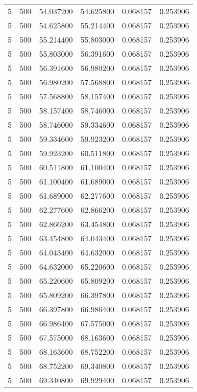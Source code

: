 \begin{longtable}{rrrrrr}
5 & 500 & 54.037200 & 54.625800 & 0.068157 & 0.253906 \\
5 & 500 & 54.625800 & 55.214400 & 0.068157 & 0.253906 \\
5 & 500 & 55.214400 & 55.803000 & 0.068157 & 0.253906 \\
5 & 500 & 55.803000 & 56.391600 & 0.068157 & 0.253906 \\
5 & 500 & 56.391600 & 56.980200 & 0.068157 & 0.253906 \\
5 & 500 & 56.980200 & 57.568800 & 0.068157 & 0.253906 \\
5 & 500 & 57.568800 & 58.157400 & 0.068157 & 0.253906 \\
5 & 500 & 58.157400 & 58.746000 & 0.068157 & 0.253906 \\
5 & 500 & 58.746000 & 59.334600 & 0.068157 & 0.253906 \\
5 & 500 & 59.334600 & 59.923200 & 0.068157 & 0.253906 \\
5 & 500 & 59.923200 & 60.511800 & 0.068157 & 0.253906 \\
5 & 500 & 60.511800 & 61.100400 & 0.068157 & 0.253906 \\
5 & 500 & 61.100400 & 61.689000 & 0.068157 & 0.253906 \\
5 & 500 & 61.689000 & 62.277600 & 0.068157 & 0.253906 \\
5 & 500 & 62.277600 & 62.866200 & 0.068157 & 0.253906 \\
5 & 500 & 62.866200 & 63.454800 & 0.068157 & 0.253906 \\
5 & 500 & 63.454800 & 64.043400 & 0.068157 & 0.253906 \\
5 & 500 & 64.043400 & 64.632000 & 0.068157 & 0.253906 \\
5 & 500 & 64.632000 & 65.220600 & 0.068157 & 0.253906 \\
5 & 500 & 65.220600 & 65.809200 & 0.068157 & 0.253906 \\
5 & 500 & 65.809200 & 66.397800 & 0.068157 & 0.253906 \\
5 & 500 & 66.397800 & 66.986400 & 0.068157 & 0.253906 \\
5 & 500 & 66.986400 & 67.575000 & 0.068157 & 0.253906 \\
5 & 500 & 67.575000 & 68.163600 & 0.068157 & 0.253906 \\
5 & 500 & 68.163600 & 68.752200 & 0.068157 & 0.253906 \\
5 & 500 & 68.752200 & 69.340800 & 0.068157 & 0.253906 \\
5 & 500 & 69.340800 & 69.929400 & 0.068157 & 0.253906 \\

\end{longtable}

